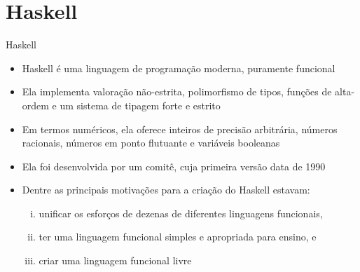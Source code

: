 \section{Haskell}

\begin{frame}[fragile]{Haskell}

    \begin{itemize}
        \item Haskell é uma linguagem de programação moderna, puramente funcional

        \item Ela implementa valoração não-estrita, polimorfismo de tipos, funções de alta-ordem
            e um sistema de tipagem forte e estrito

        \item Em termos numéricos, ela oferece inteiros de precisão arbitrária, números racionais,
            números em ponto flutuante e variáveis booleanas

        \item Ela foi desenvolvida por um comitê, cuja primeira versão data de 1990

        \item Dentre as principais motivações para a criação do Haskell estavam:

        \begin{enumerate}[i.]
            \item unificar os esforços de dezenas de diferentes linguagens funcionais,
            \item ter uma linguagem funcional simples e apropriada para ensino, e
            \item criar uma linguagem funcional livre
        \end{enumerate}
    \end{itemize}

\end{frame}

